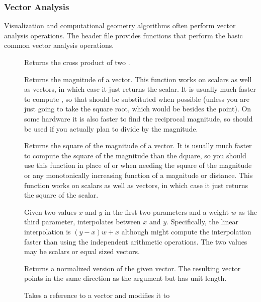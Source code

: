 \subsubsection{Vector Analysis}

Visualization and computational geometry algorithms often perform vector
analysis operations. The  header file
provides functions that perform the basic common vector analysis
operations.

\begin{description}
\item[]  Returns the cross product of
  two .
\item[] Returns the magnitude of a vector. This function
  works on scalars as well as vectors, in which case it just returns the
  scalar. It is usually much faster to compute
  , so that should be substituted when
  possible (unless you are just going to take the square root, which would
  be besides the point). On some hardware it is also faster to find the
  reciprocal magnitude, so  should be used if
  you actually plan to divide by the magnitude.
\item[] Returns the square of the magnitude of a
  vector. It is usually much faster to compute the square of the magnitude
  than the dquare, so you should use this function in place of
   or  when needing
  the square of the magnitude or any monotonically increasing function of a
  magnitude or distance. This function works on scalars as well as vectors,
  in which case it just returns the square of the scalar.
\item[]  Given two values $x$ and
  $y$ in the first two parameters and a  weight $w$ as the
  third parameter, interpolates between $x$ and $y$. Specifically, the
  linear interpolation is $(y-x)w + x$ although  might
  compute the interpolation faster than using the independent arithmetic
  operations. The two values may be scalars or equal sized vectors.
\item[] Returns a normalized version of the given
  vector. The resulting vector points in the same direction as the argument
  but has unit length.
\item[] Takes a reference to a vector and modifies it to

\end{description}
